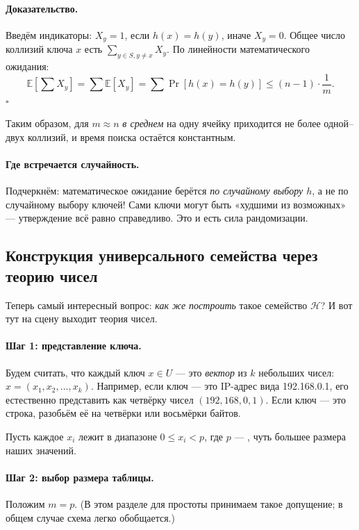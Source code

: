 \paragraph*{Доказательство.} Введём индикаторы: $X_y = 1$, если $h(x) = h(y)$, иначе $X_y = 0$. Общее число коллизий ключа $x$ есть $\sum_{y \in S, y \ne x} X_y$. По линейности математического ожидания:
\[
  \mathbb{E}\!\left[\sum X_y\right] = \sum \mathbb{E}[X_y] = \sum \Pr[h(x) = h(y)] \le (n-1) \cdot \frac{1}{m}.
\]
\hfill$\square$

Таким образом, для $m \approx n$ \emph{в среднем} на одну ячейку приходится не более одной--двух коллизий, и время поиска остаётся константным.

\paragraph*{Где встречается случайность.} Подчеркнём: математическое ожидание берётся \emph{по случайному выбору $h$}, а не по случайному выбору ключей! Сами ключи могут быть «худшими из возможных» --- утверждение всё равно справедливо. Это и есть сила рандомизации.

\subsection{Конструкция универсального семейства через теорию чисел}

Теперь самый интересный вопрос: \emph{как же построить} такое семейство $\mathcal{H}$? И вот тут на сцену выходит теория чисел.

\paragraph*{Шаг 1: представление ключа.} Будем считать, что каждый ключ $x \in U$ --- это \emph{вектор} из $k$ небольших чисел: $x = (x_1, x_2, \dots, x_k)$. Например, если ключ --- это IP-адрес вида 192.168.0.1, его естественно представить как четвёрку чисел $(192, 168, 0, 1)$. Если ключ --- это строка, разобьём её на четвёрки или восьмёрки байтов.

Пусть каждое $x_i$ лежит в диапазоне $0 \le x_i < p$, где $p$ --- , чуть большее размера наших значений.

\paragraph*{Шаг 2: выбор размера таблицы.} Положим $m = p$. (В этом разделе для простоты принимаем такое допущение; в общем случае схема легко обобщается.)

